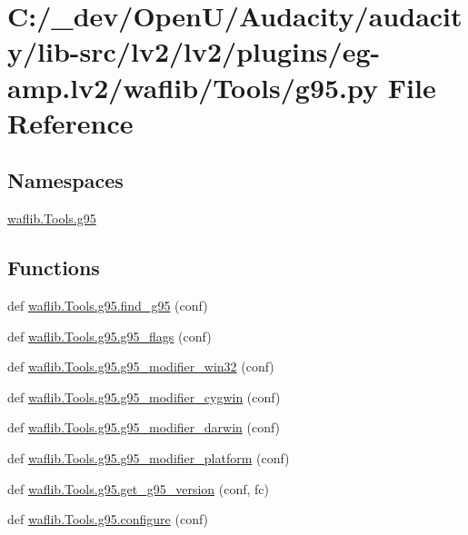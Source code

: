 \hypertarget{lv2_2plugins_2eg-amp_8lv2_2waflib_2_tools_2g95_8py}{}\section{C\+:/\+\_\+dev/\+Open\+U/\+Audacity/audacity/lib-\/src/lv2/lv2/plugins/eg-\/amp.lv2/waflib/\+Tools/g95.py File Reference}
\label{lv2_2plugins_2eg-amp_8lv2_2waflib_2_tools_2g95_8py}
\subsection*{Namespaces}
\begin{DoxyCompactItemize}
\item 
 \hyperlink{namespacewaflib_1_1_tools_1_1g95}{waflib.\+Tools.\+g95}
\end{DoxyCompactItemize}
\subsection*{Functions}
\begin{DoxyCompactItemize}
\item 
def \hyperlink{namespacewaflib_1_1_tools_1_1g95_a3be6ad150899555106884ccd7f485782}{waflib.\+Tools.\+g95.\+find\+\_\+g95} (conf)
\item 
def \hyperlink{namespacewaflib_1_1_tools_1_1g95_a219eb212c9e3c16c14c4be4c75fe81cc}{waflib.\+Tools.\+g95.\+g95\+\_\+flags} (conf)
\item 
def \hyperlink{namespacewaflib_1_1_tools_1_1g95_a13f942cc0288d10a196243598d9ba608}{waflib.\+Tools.\+g95.\+g95\+\_\+modifier\+\_\+win32} (conf)
\item 
def \hyperlink{namespacewaflib_1_1_tools_1_1g95_a3363ec27e958d5ce39d5556234385475}{waflib.\+Tools.\+g95.\+g95\+\_\+modifier\+\_\+cygwin} (conf)
\item 
def \hyperlink{namespacewaflib_1_1_tools_1_1g95_a67982aa3652753344baa933e39fe4076}{waflib.\+Tools.\+g95.\+g95\+\_\+modifier\+\_\+darwin} (conf)
\item 
def \hyperlink{namespacewaflib_1_1_tools_1_1g95_a9faf0774c7c31790a714ca21fdb9806b}{waflib.\+Tools.\+g95.\+g95\+\_\+modifier\+\_\+platform} (conf)
\item 
def \hyperlink{namespacewaflib_1_1_tools_1_1g95_a753e499b2ec1d9c6960514b2f66c5b34}{waflib.\+Tools.\+g95.\+get\+\_\+g95\+\_\+version} (conf, fc)
\item 
def \hyperlink{namespacewaflib_1_1_tools_1_1g95_a7cb58685ba6d130068f6a04dc68383a1}{waflib.\+Tools.\+g95.\+configure} (conf)
\end{DoxyCompactItemize}
